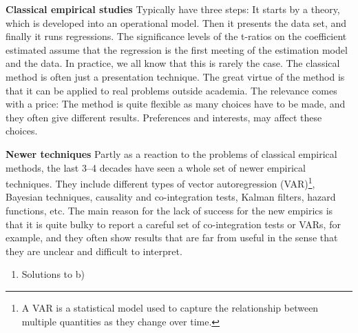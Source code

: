 \documentclass[
  12pt,
  oneside]{book}
\providecommand{\tightlist}{%
  \setlength{\itemsep}{0pt}\setlength{\parskip}{0pt}}
\theoremstyle{definition}
\theoremstyle{definition}
\theoremstyle{definition}
\theoremstyle{definition}
\theoremstyle{remark}
\begin{document}
\textbf{Classical empirical studies}
Typically have three steps: It starts by a theory, which is developed into an operational model. Then it presents the data set, and finally it runs regressions. The significance levels of the t-ratios on the coefficient estimated assume that the regression is the first meeting of the estimation model and the data. In practice, we all know that this is rarely the case. The classical method is often just a presentation technique. The great virtue of the method is that it can be applied to real problems outside academia. The relevance comes with a price: The method is quite flexible as many choices have to be made, and they often give different results. Preferences and interests, may affect these choices.

\textbf{Newer techniques}
Partly as a reaction to the problems of classical empirical methods, the last 3--4 decades have seen a whole set of newer empirical techniques. They include different types of vector autoregression (VAR)\footnote{A VAR is a statistical model used to capture the relationship between multiple quantities as they change over time.}, Bayesian techniques, causality and co-integration tests, Kalman filters, hazard functions, etc. The main reason for the lack of success for the new empirics is that it is quite bulky to report a careful set of co-integration tests or VARs, for example, and they often show results that are far from useful in the sense that they are unclear and difficult to interpret.

\begin{enumerate}
\def\labelenumi{\alph{enumi})}
\setcounter{enumi}{1}
\tightlist
\item
  Solutions to b)
\end{enumerate}
\end{document}
